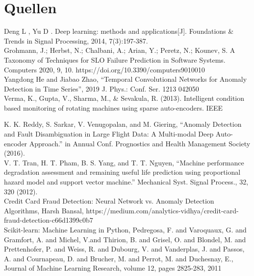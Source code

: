 \documentclass[12pt,a4paper]{scrartcl}
\numberwithin{equation}{section}
\begin{document}
\thispagestyle{plain}
 \newpage
\clearpage

\thispagestyle{plain}

 \newpage  %
\section*{Quellen}

\thispagestyle{plain}

\noindent [1] Deng L , Yu D . Deep learning: methods and applications[J]. Foundations \& Trends in Signal Processing, 2014, 7(3):197-387. \\

\noindent [2] 	Grohmann, J.; Herbst, N.; Chalbani, A.; Arian, Y.; Peretz, N.; Kounev, S. A Taxonomy of Techniques for SLO Failure Prediction in Software Systems. Computers 2020, 9, 10. https://doi.org/10.3390/computers9010010 \\

\noindent [3]	 Yangdong He and Jiabao Zhao, “Temporal Convolutional Networks for Anomaly Detection in Time Series”, 2019 J. Phys.: Conf. Ser. 1213 042050 \\

\noindent [4] 	Verma, K., Gupta, V., Sharma, M., \& Sevakula, R. (2013). Intelligent condition based monitoring of rotating machines using sparse auto-encoders. IEEE

\noindent [5]	 K. K. Reddy, S. Sarkar, V. Venugopalan, and M. Giering, “Anomaly Detection and Fault Disambiguation in Large Flight Data: A Multi-modal Deep Auto-encoder Approach.” in Annual Conf. Prognostics and Health Management Society (2016). \\

\noindent [6] 	V. T. Tran, H. T. Pham, B. S. Yang, and T. T. Nguyen, “Machine performance degradation assessment and remaining useful life prediction using proportional hazard model and support vector machine.” Mechanical Syst. Signal Process., 32, 320 (2012). \\

\noindent [7] 	Credit Card Fraud Detection: Neural Network vs. Anomaly Detection Algorithms, Harsh Bansal, https://medium.com/analytics-vidhya/credit-card-fraud-detection-c66d1399c0b7 \\

\noindent [8] 	Scikit-learn: Machine Learning in Python, Pedregosa, F. and Varoquaux, G. and Gramfort, A. and Michel, V.and Thirion, B. and Grisel, O. and Blondel, M. and Prettenhofer, P. and Weiss, R. and Dubourg, V. and Vanderplas, J. and Passos, A. and Cournapeau, D. and Brucher, M. and Perrot, M. and Duchesnay, E., Journal of Machine Learning Research, volume 12, pages 2825-283, 2011 \\
\end{document}
